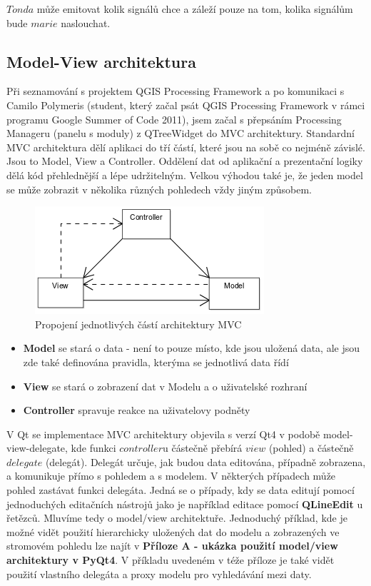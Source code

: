 \noindent $Tonda$ může emitovat kolik signálů chce a záleží pouze na tom, kolika signálům bude $marie$ naslouchat.

\subsection{Model-View architektura}
Při seznamování s projektem QGIS Processing Framework a po komunikaci
s Camilo Polymeris (student, který začal psát QGIS Processing
Framework v rámci programu Google Summer of Code 2011), jsem začal s
přepsáním Processing Manageru (panelu s moduly) z QTreeWidget do MVC
architektury. Standardní MVC architektura dělí aplikaci do tří částí,
které jsou na sobě co nejméně závislé. Jsou to Model, View a
Controller. Oddělení dat od aplikační a prezentační logiky dělá kód
přehlednější a lépe udržitelným. Velkou výhodou také je, že jeden
model se může zobrazit v několika různých pohledech vždy jiným
způsobem.

\begin{figure}[h]
	\centering
	\includegraphics[scale=0.7]{pictures/qt/mvc}
	\caption{Propojení jednotlivých částí architektury MVC}
	\label{mvc}
\end{figure}

\begin{itemize}
	\item{\textbf{Model}} se stará o data - není to pouze místo, kde jsou uložená data, ale jsou zde také definována pravidla, kterýma se jednotlivá data řídí
	\item{\textbf{View}} se stará o zobrazení dat v Modelu a o uživatelské rozhraní
	\item{\textbf{Controller}} spravuje reakce na uživatelovy podněty %
\end{itemize}

V Qt se implementace MVC architektury objevila s verzí Qt4 v podobě
model-view-delegate, kde funkci $controller$u částečně přebírá $view$
(pohled) a částečně $delegate$ (delegát). Delegát určuje, jak budou
data editována, případně zobrazena, a komunikuje přímo s pohledem a s
modelem. V některých případech může pohled zastávat funkci
delegáta. Jedná se o případy, kdy se data editují pomocí jednoduchých
editačních nástrojů jako je například editace
pomocí \textbf{QLineEdit} u řetězců. Mluvíme tedy o model/view
architektuře. Jednoduchý příklad, kde je možné vidět použití
hierarchicky uložených dat do modelu a zobrazených ve stromovém
pohledu lze najít v \textbf{Příloze A - ukázka použití model/view
architektury v PyQt4}. V příkladu uvedeném v téže příloze je také
vidět použití vlastního delegáta a proxy modelu pro vyhledávání mezi
daty.

